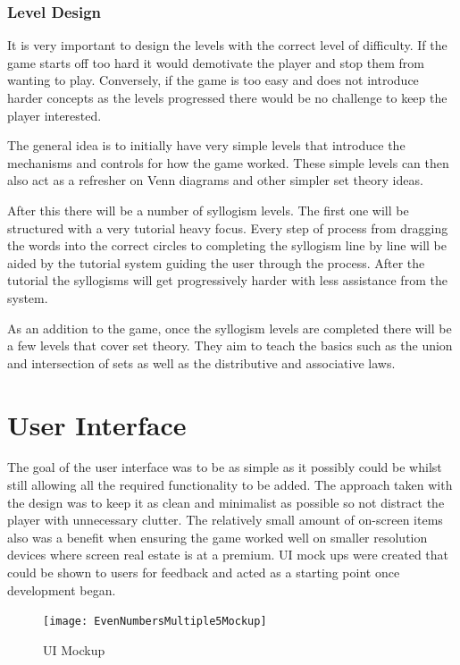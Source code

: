 \documentclass[12pt,a4paper]{report}
\begin{document}
\subsubsection{Level Design}
It is very important to design the levels with the correct level of difficulty. If the game starts off too hard it would demotivate the player and stop them from wanting to play. Conversely, if the game is too easy and does not introduce harder concepts as the levels progressed there would be no challenge to keep the player interested.

The general idea is to initially have very simple levels that introduce the mechanisms and controls for how the game worked. These simple levels can then also act as a refresher on Venn diagrams and other simpler set theory ideas.

After this there will be a number of syllogism levels. The first one will be structured with a very tutorial heavy focus. Every step of process from dragging the words into the correct circles to completing the syllogism line by line will be aided by the tutorial system guiding the user through the process. After the tutorial the syllogisms will get progressively harder with less assistance from the system.

As an addition to the game, once the syllogism levels are completed there will be a few levels that cover set theory. They aim to teach the basics such as the union and intersection of sets as well as the distributive and associative laws. 

\section{User Interface}
The goal of the user interface was to be as simple as it possibly could be whilst still allowing all the required functionality to be added. The approach taken with the design was to keep it as clean and minimalist as possible so not distract the player with unnecessary clutter. The relatively small amount of on-screen items also was a benefit when ensuring the game worked well on smaller resolution devices where screen real estate is at a premium. UI mock ups were created that could be shown to users for feedback and acted as a starting point once development began.

\begin{figure}[h]
  \centering
  \begin{minipage}[b]{1\textwidth}
    \texttt{[image: EvenNumbersMultiple5Mockup]}
    \caption{UI Mockup}
  \end{minipage}
\end{figure}
\FloatBarrier
\end{document}

